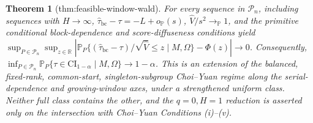 \documentclass{article}
\newtheorem{theorem}{Theorem}
\begin{document}
\begin{theorem}[thm:feasible-window-wald]\label{thm:feasible-window-wald}
For every sequence in \(\mathcal P_n\), including sequences with \(H\to\infty\), \(\widehat\tau_{\mathrm{bc}}-\tau=-L+o_{\mathbb P}(s)\), \(\widehat V/s^2\to_{\mathbb P}1\), and the primitive conditional block-dependence and score-diffuseness conditions yield \(\sup_{P\in\mathcal P_n}\sup_{z\in\mathbb R}|\mathbb P_P\{(\widehat\tau_{\mathrm{bc}}-\tau)/\sqrt{\widehat V}\le z\mid M,\Omega\}-\Phi(z)|\to0\). Consequently, \(\inf_{P\in\mathcal P_n}\mathbb P_P\{\tau\in\mathrm{CI}_{1-\alpha}\mid M,\Omega\}\to1-\alpha\). This is an extension of the balanced, fixed-rank, common-start, singleton-subgroup Choi--Yuan regime along the serial-dependence and growing-window axes, under a strengthened uniform class. Neither full class contains the other, and the \(q=0,H=1\) reduction is asserted only on the intersection with Choi--Yuan Conditions (i)--(v).
\end{theorem}
\end{document}
